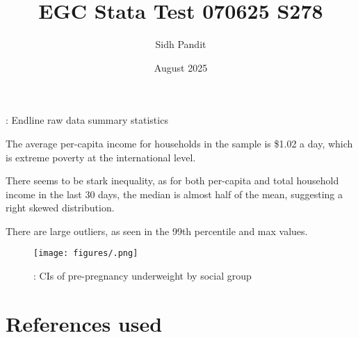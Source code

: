 \documentclass[12pt]{article}
\title{EGC Stata Test 070625 S278}
\author{Sidh Pandit}
\date{August 2025}
\begin{document}
\maketitle

\begin{table}[H]
    \centering
    \scriptsize %
    \setlength{\tabcolsep}{2pt}
    \renewcommand{\arraystretch}{2}
    \resizebox{\textwidth}{!}{}
    \caption{: Endline raw data summary statistics}
\end{table}


The average per-capita income for households in the sample is \$1.02 a day, which is extreme poverty at the international level. 

There seems to be stark inequality, as for both per-capita and total household income in the last 30 days, the median is almost half of the mean, suggesting a right skewed distribution.


There are large outliers, as seen in the 99th percentile and max values.


\begin{figure}[H]
    \centering
    \texttt{[image: figures/.png]}
    \caption{: CIs of pre-pregnancy underweight by social group}
\end{figure}







\section{References used}
\end{document}
